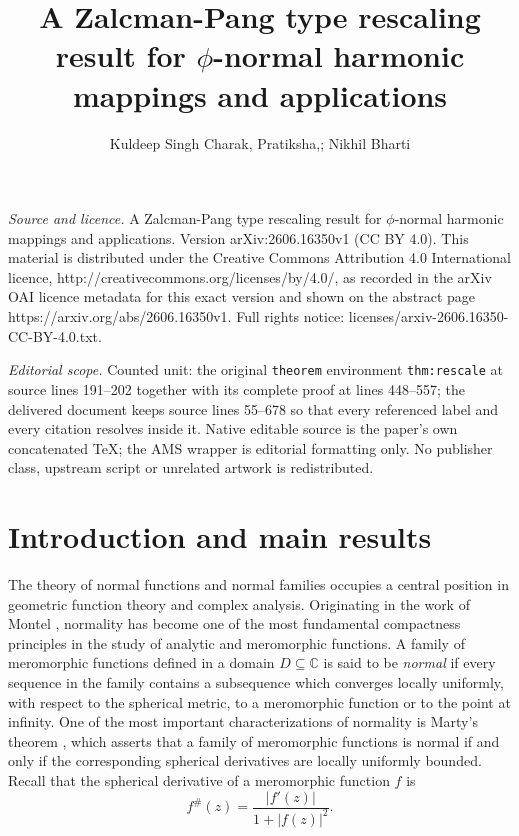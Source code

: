 \documentclass[10pt,a4paper]{amsart}
\newcommand{\C}{\mathbb{C}}
\begin{document}
\title[A Zalcman-Pang type rescaling result for phi-normal harmonic]{A Zalcman-Pang type rescaling result for $\phi$-normal harmonic mappings and applications}
\author{Kuldeep Singh Charak, Pratiksha,; Nikhil Bharti}
\date{}
\maketitle
\noindent\emph{Source and licence.} A Zalcman-Pang type rescaling result for $\phi$-normal harmonic mappings and applications. Version arXiv:2606.16350v1 (CC BY 4.0). This material is distributed under the Creative Commons Attribution 4.0 International licence, http://creativecommons.org/licenses/by/4.0/, as recorded in the arXiv OAI licence metadata for this exact version and shown on the abstract page https://arxiv.org/abs/2606.16350v1. Full rights notice: licenses/arxiv-2606.16350-CC-BY-4.0.txt.\par\smallskip
\noindent\textit{Editorial scope.} Counted unit: the original \texttt{theorem} environment \texttt{thm:rescale} at source lines 191--202 together with its complete proof at lines 448--557; the delivered document keeps source lines 55--678 so that every referenced label and every citation resolves inside it. Native editable source is the paper's own concatenated TeX; the AMS wrapper is editorial formatting only. No publisher class, upstream script or unrelated artwork is redistributed.
\section{Introduction and main results}

The theory of normal functions and normal families occupies a central position in
geometric function theory and complex analysis. Originating in the work of Montel
\cite{Montel}, normality has become one of the most fundamental compactness principles in
the study of analytic and meromorphic functions. A family of meromorphic functions
defined in a domain $D\subseteq\C$ is said to be \emph{normal} if every sequence in the
family contains a subsequence which converges locally uniformly, with respect to the
spherical metric, to a meromorphic function or to the point at infinity. One of the most
important characterizations of normality is Marty's theorem \cite[Theorem~4]{Marty}, which
asserts that a family of meromorphic functions is normal if and only if the corresponding
spherical derivatives are locally uniformly bounded. Recall that the spherical derivative
of a meromorphic function $f$ is
\begin{equation}\label{eq:sphmero}
f^{\#}(z)=\frac{|f'(z)|}{1+|f(z)|^{2}}.
\end{equation}
\end{document}
